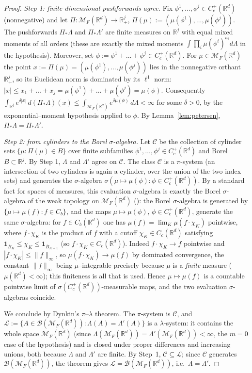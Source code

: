 \documentclass[11pt]{article}
\theoremstyle{definition}
\theoremstyle{remark}
\newcommand{\R}{\mathbb{R}}
\newcommand{\cM}{{\mathcal{M}_F(\R^d)}}          %
\newcommand{\Cc}{C_c^+(\R^d)}
\numberwithin{equation}{section}
\theoremstyle{plain}
\theoremstyle{definition}
\theoremstyle{remark}
\theoremstyle{plain}
\begin{document}
\begin{proof}
\emph{Step 1: finite-dimensional pushforwards agree.}
Fix $\phi^1,\dots,\phi^j\in\Cc$ (nonnegative) and let
$\Pi:\cM\to\R_+^j$, $\Pi(\mu):=(\mu(\phi^1),\dots,\mu(\phi^j))$. The
pushforwards $\Pi_*\Lambda$ and $\Pi_*\Lambda'$ are finite measures on $\R^j$
with equal mixed moments of all orders (these are exactly the mixed moments
$\int\prod_i\mu(\phi^i)^{a_i}d\Lambda$ in the hypothesis). Moreover, set
$\phi:=\phi^1+\dots+\phi^j\in\Cc$. For $\mu\in\cM$ the point
$x:=\Pi(\mu)=(\mu(\phi^1),\dots,\mu(\phi^j))$ lies in the nonnegative orthant
$\R_+^j$, so its Euclidean norm is dominated by its $\ell^1$ norm:
$|x|\le x_1+\dots+x_j=\mu(\phi^1)+\dots+\mu(\phi^j)=\mu(\phi)$. Consequently
$\int_{\R^j}e^{\delta|x|}\,d(\Pi_*\Lambda)(x)\le\int_\cM e^{\delta\mu(\phi)}
\,d\Lambda<\infty$ for some $\delta>0$, by the exponential--moment hypothesis
applied to $\phi$. By Lemma~\ref{lem:petersen}, $\Pi_*\Lambda=\Pi_*\Lambda'$.

\emph{Step 2: from cylinders to the Borel $\sigma$-algebra.}
Let $\mathcal C$ be the collection of cylinder sets
$\{\mu:\Pi(\mu)\in B\}$ over finite subfamilies $\phi^1,\dots,\phi^j\in\Cc$
and Borel $B\subset\R^j$. By Step 1, $\Lambda$ and $\Lambda'$ agree on
$\mathcal C$. The class $\mathcal C$ is a $\pi$-system (an intersection of two
cylinders is again a cylinder, over the union of the two index sets) and
generates the $\sigma$-algebra
$\sigma(\mu\mapsto\mu(\phi):\phi\in\Cc)$. By a standard fact for spaces of
measures, this evaluation $\sigma$-algebra is exactly the Borel
$\sigma$-algebra of the weak topology on $\cM$
(\cite[Lemma~4.7]{Kal17}): the Borel
$\sigma$-algebra is generated by $\{\mu\mapsto\mu(f):f\in C_b\}$, and the
maps $\mu\mapsto\mu(\phi)$, $\phi\in\Cc$, generate the same $\sigma$-algebra:
for $f\in C_b(\R^d)$ one has $\mu(f)=\lim_K\mu(f\cdot\chi_K)$ pointwise,
where $f\cdot\chi_K$ is the product of $f$ with a cutoff
$\chi_K\in C_c(\R^d)$ satisfying $\mathbf 1_{\overline B_K}\le\chi_K\le\mathbf 1_{\overline B_{K+1}}$
(so $f\cdot\chi_K\in C_c(\R^d)$). Indeed $f\cdot\chi_K\to f$ pointwise and
$|f\cdot\chi_K|\le\|f\|_\infty$, so $\mu(f\cdot\chi_K)\to\mu(f)$ by dominated
convergence, the constant $\|f\|_\infty$ being $\mu$--integrable precisely
because $\mu$ is a \emph{finite} measure ($\mu(\R^d)<\infty$); this finiteness
is all that is used. Hence $\mu\mapsto\mu(f)$ is a countable pointwise limit of
$\sigma(\Cc)$-measurable maps, and the two evaluation $\sigma$-algebras
coincide.

We conclude by Dynkin's $\pi$--$\lambda$ theorem. The $\pi$-system is
$\mathcal C$, and $\mathcal L:=\{A\in\mathcal B(\cM):\Lambda(A)=\Lambda'(A)\}$
is a $\lambda$-system: it contains the whole space $\cM$ (since
$\Lambda(\cM)=\Lambda'(\cM)<\infty$, the $m=0$ case of the hypothesis) and is
closed under proper differences and increasing unions, both because $\Lambda$
and $\Lambda'$ are finite. By Step~1, $\mathcal C\subseteq\mathcal L$; since
$\mathcal C$ generates $\mathcal B(\cM)$, the theorem gives
$\mathcal L=\mathcal B(\cM)$, i.e.\ $\Lambda=\Lambda'$.
\end{proof}
\end{document}
